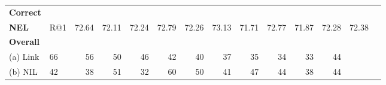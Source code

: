 \begin{table}
\begin{tabular}{llrrrrrrrrrrrr}
\textbf{Correct} &&&&&&&&&&&& \\
\textbf{NEL} & R@1          &   72.64 &  72.11 &   72.24 &   72.79 &  72.26 &  73.13 &   71.71 &   72.77 &  71.87 &   72.28 &  72.38 & \\
\hline
\textbf{Overall} \\
(a) Link & 66 & 56 & 50 & 46 & 42 & 40 & 37 & 35 & 34 & 33 & 44 & \\ 
(b) NIL & 42 & 38 & 51 & 32 & 60 & 50 & 41 & 47 & 44 & 38 & 44 & \\ 

\end{tabular}
\end{table}
